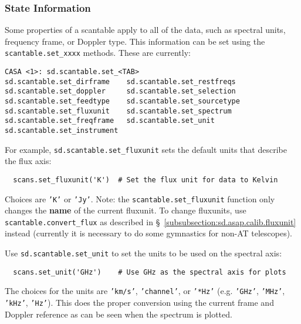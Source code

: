 \subsubsection{State Information}
\label{subsubsection:sd.asap.scantable.state}

Some properties of a scantable apply to all of the data, such as
spectral units, frequency frame, or Doppler type. This
information can be set using the %
{\tt scantable.set\_xxxx}
methods.  These are currently:
\small
\begin{verbatim}
CASA <1>: sd.scantable.set_<TAB>
sd.scantable.set_dirframe    sd.scantable.set_restfreqs
sd.scantable.set_doppler     sd.scantable.set_selection
sd.scantable.set_feedtype    sd.scantable.set_sourcetype
sd.scantable.set_fluxunit    sd.scantable.set_spectrum
sd.scantable.set_freqframe   sd.scantable.set_unit
sd.scantable.set_instrument  
\end{verbatim}
\normalsize

For example, {\tt sd.scantable.set\_fluxunit} sets the default units
that describe the flux axis:
\small
\begin{verbatim}
  scans.set_fluxunit('K')  # Set the flux unit for data to Kelvin
\end{verbatim}
\normalsize
Choices are {\tt 'K'} or {\tt 'Jy'}.
Note: the {\tt scantable.set\_fluxunit} function only changes the {\bf name}
of the current fluxunit. To change fluxunits, use 
{\tt scantable.convert\_flux} as described in 
\S~\ref{subsubsection:sd.asap.calib.fluxunit}
instead (currently it is necessary to do some gymnastics for non-AT
telescopes).

Use {\tt sd.scantable.set\_unit} to set the units to be used on 
the spectral axis:
\small
\begin{verbatim}
  scans.set_unit('GHz')    # Use GHz as the spectral axis for plots
\end{verbatim}
\normalsize
The choices for the units are {\tt 'km/s'}, {\tt 'channel'}, or
{\tt '*Hz'} (e.g. {\tt 'GHz'}, {\tt 'MHz'}, {\tt 'kHz'}, {\tt 'Hz'}).
This does the proper conversion using the current frame and Doppler
reference as can be seen when the spectrum is plotted.

